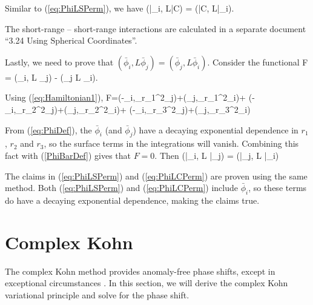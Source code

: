 \documentclass[Dissertation.tex]{subfiles}
\begin{document}
Similar to (\ref{eq:PhiLSPerm}), we have
\beq
(\bar{\phi}_i, L\bar{C}) = (\bar{C}, L\bar{\phi}_i).
\label{eq:PhiLCPerm}
\eeq

The short-range -- short-range interactions are calculated in a separate document ``3.24 Using Spherical Coordinates''.

Lastly, we need to prove that $\left(\bar{\phi}_i, L \bar{\phi}_j\right) = \left(\bar{\phi}_j, L \bar{\phi}_i\right)$.  Consider the functional
\beq
F = (\phi_i, L \phi_j) - (\phi_j L \phi_i).
\eeq

Using (\ref{eq:Hamiltonian1}),
\beq
	F=\left({-\phi_i,{_{{r}_{1}}^{2}\phi_j}}\right)+\left({\phi_j,{_{{r}_{1}}^{2}\phi_i}}\right)+
	\left({-\phi_i,{_{{r}_{2}}^{2}\phi_j}}\right)+\left({\phi_j,{_{{r}_{2}}^{2}\phi_i}}\right)+
	\left({-\phi_i,{_{{r}_{3}}^{2}\phi_j}}\right)+\left({\phi_j,{_{{r}_{3}}^{2}\phi_i}}\right)
\eeq

From (\ref{eq:PhiDef}), the $\bar{\phi}_i$ (and $\bar{\phi}_j$) have a decaying exponential dependence in $r_1$, $r_2$ and $r_3$, so the surface terms in the integrations will vanish.  Combining this fact with (\ref{PhiBarDef}) gives that $F = 0$.  Then
\beq
\left(\bar{\phi}_i, L \bar{\phi}_j\right) = \left(\bar{\phi}_j, L \bar{\phi}_i\right)
\label{PhiLPhiPerm}
\eeq

The claims in (\ref{eq:PhiLSPerm}) and (\ref{eq:PhiLCPerm}) are proven using the same method.  Both (\ref{eq:PhiLSPerm}) and (\ref{eq:PhiLCPerm}) include $\bar{\phi}_i$, so these terms do have a decaying exponential dependence, making the claims true.




\section{Complex Kohn}

The complex Kohn method provides anomaly-free phase shifts, except in exceptional circumstances \cite{Lucchese1989}.  In this section, we will derive the complex Kohn variational principle and solve for the phase shift.
\end{document}
